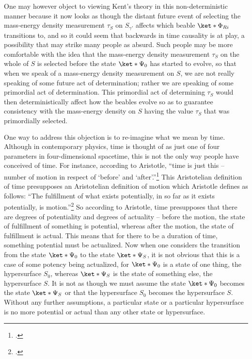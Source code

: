 \documentclass[12pt]{report}
\begin{document}
One may however object to viewing Kent's theory in this non-deterministic manner because it now looks as though the distant future event of selecting the mass-energy density measurement $\tau_S$  on $S_{\gamma'}$ affects which beable $\ket*{\Phi_{Ri}}$ transitions to, and so it could seem that backwards in time causality is at play, a possibility that may strike many people as absurd. Such people may be more comfortable with the idea that the mass-energy density measurement $\tau_S$ on the whole of $S$ is selected before the state $\ket*{\Psi_0}$ has started to evolve, so that when we speak of a mass-energy density measurement on $S$, we are not really speaking of some future act of determination; rather we are speaking of some primordial act of determination. This primordial act of determining $\tau_S$ would then deterministically affect how the beables evolve so as to guarantee consistency with the mass-energy density on $S$ having the value $\tau_S$ that was primordially selected.

One way to address this objection is to re-imagine what we mean by time. Although in contemporary physics, time is thought of as just one of four parameters in four-dimensional spacetime, this is not the only way people have conceived of time. For instance, according to Aristotle, ``time is just this -- number of motion in respect of `before' and `after'.''\footnote{\cite[ Book IV. Chapter 11 (219b 1-5)]{AristotlePhysics}.} This Aristotelian definition of time presupposes an Aristotelian definition of motion which Aristotle defines as follows: ``The fulfillment of what exists potentially, in so far as it exists potentially, is motion.''\footnote{\cite[ Book III. Chapter 1 (201a10)]{AristotlePhysics}.} So according to Aristotle, time presupposes that there are degrees of potentiality and degrees of actuality -- before the motion, the state of fulfillment of something is potential, whereas after the motion, the state of fulfillment is actual. This means that for there to be a duration of time, something potential must be actualized. Now when one considers the transition from the state $\ket*{\Psi_0}$ to the state  $\ket*{\Psi_S}$, it is not obvious that this is a case of some potency being actualized, for $\ket*{\Psi_0}$ is a state of one thing, the hypersurface $S_0$,  whereas $\ket*{\Psi_S}$ is the state of something else, the hypersurface $S$. It is not as though we must assume the state $\ket*{\Psi_0}$ becomes the state $\ket*{\Psi_S}$ or that the hypersurface $S_0$ becomes the hypersurface $S$. Without any further assumptions, a particular state or a particular hypersurface is no more potential or actual than any other state or hypersurface. 
\end{document}
